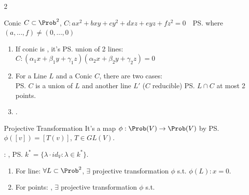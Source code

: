 \documentclass{note}
\begin{document}
\begin{multicols}{2}
    \begin{MyTh}{Conic}
        $C\subset \Prob^2$, $C: ax^2+bxy+cy^2+dxz+eyz+fz^2=0$\ \ \ps{\tiny where $(a,...,f)\neq(0,...,0)$}

        \begin{enumerate}
            \item If conic is , it's \ps{union of 2 lines}: {\tiny $C: (\alpha_1x+\beta_1y+\gamma_1z)(\alpha_2x+\beta_2y+\gamma_2z)=0$}
            \item For a Line $L$ and a Conic $C$, there are two cases: \\
             \ps{$C$ is a union of $L$ and another line $L'$ ($C$ reducible)} \quad {} \ps{$L\cap C$ at most 2 points.}
            \item {}.
        \end{enumerate}
    \end{MyTh}

    \begin{MyTh}{Projective Transformation}
        It's a map $\phi: \Prob(V) \to \Prob(V)$ by \ps{$\phi([v]) = [T(v)]$}, {\tiny $T\in GL(V)$.}

        \quad {}: , \ps{\tiny $k^*=\{\lambda \cdot id_V: \lambda \in k^*\}$}. \ \ 

        \begin{enumerate}
            \item For line: $\forall L\subset \Prob^2$, $\exists$ projective transformation $\phi$ s.t. $\phi(L): x=0$.
            \item For points: , $\exists$ projective transformation $\phi$ s.t. 
        \end{enumerate}
    \end{MyTh}

    \columnbreak

    \section{}

\end{multicols}
\end{document}
